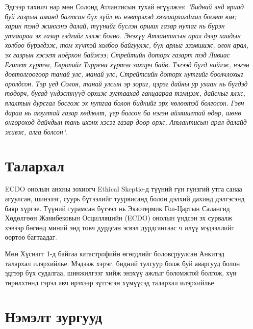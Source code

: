 \documentclass[10pt,twocolumn,letterpaper]{article}
\begin{document}
Эдгээр тахилч нар мөн Солонд Атлантисын тухай өгүүлжээ: \textit{"Бидний энд яриад буй газрын аманд багтсан бүх зүйл нь нэвтрэхэд хязгаарлагдмал боомт юм; харин тэнд жинхэнэ далай, түүнийг бүслэн орших газар нутаг нь бүрэн утгаараа эх газар гэдгийг хэлж болно. Энэхүү Атлантисын арал дээр хаадын холбоо бүрэлдэж, том хүчтэй холбоо байгуулж, бүх арлыг эзэмшиж, олон арал, эх газрын хэсэгт ноёрхон байжээ; Стрейтийн доторх газарт тэд Ливиас Египет хүртэл, Европийг Тиррени хүртэл захирч байв. Тэгээд бүгд нийлж, нэгэн довтолгоогоор танай улс, манай улс, Стрейтсийн доторх нутгийг боолчлохыг оролдсон. Тэр үед Солон, танай улсын эр зориг, цэрэг дайны ур ухаан нь бүгдэд тодорч, бусад үндэстнүүд орхиж зугтаахад ганцаараа тэмцэж, дайсныг ялж, ялалтын дурсгал босгож эх нутгаа болон биднийг эрх чөлөөтэй болгосон. Гэвч дараа нь аюултай газар хөдлөлт, үер болсон ба нэгэн аймшигтай өдөр, шөнө өнгөрөхөд дайчдын тань ихэнх хэсэг газар доор орж, Атлантисын арал далайд живж, алга болсон"}.

\section{Талархал}

ECDO онолын анхны зохиогч Ethical Skeptic-д түүний гүн гүнзгий утга санаа агуулсан, шинэлэг, суурь бүтээлийг туурвисанд болон дэлхий дахинд дэлгэсэнд баяр хүргэе. Түүний гурамсан бүтээл \cite{1} нь Экзотермик Гол-Цартын Салангид Хөдөлгөөн Жанибековын Осцилляцийн (ECDO) онолын үндсэн эх сурвалж хэвээр бөгөөд миний энд товч дурдсан эсвэл дурдсангаас ч илүү мэдээллийг өөртөө багтаадаг.

Мөн Хүснэгт 1-д байгаа катастрофийн өгөгдлийг боловсруулсан Анкитэд талархал илэрхийлье.
Мэдээж хэрэг, бидний тулгуур болж буй аваргууд болон эдгээр бүх судалгаа, шинжилгээг хийж энэхүү ажлыг боломжтой болгож, хүн төрөлхтөнд гэрэл авч ирэхээр зүтгэсэн хүмүүсэд талархал илэрхийлье.

\clearpage
\twocolumn

\section{Нэмэлт зургууд}
\end{document}
